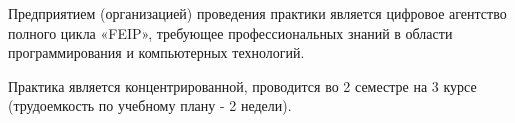 Предприятием (организацией) проведения практики является цифровое агентство полного цикла «FEIP», 
требующее профессиональных знаний в области программирования и компьютерных технологий.

Практика является концентрированной, проводится во 2 семестре на 3 курсе (трудоемкость по учебному плану - 2 недели).
